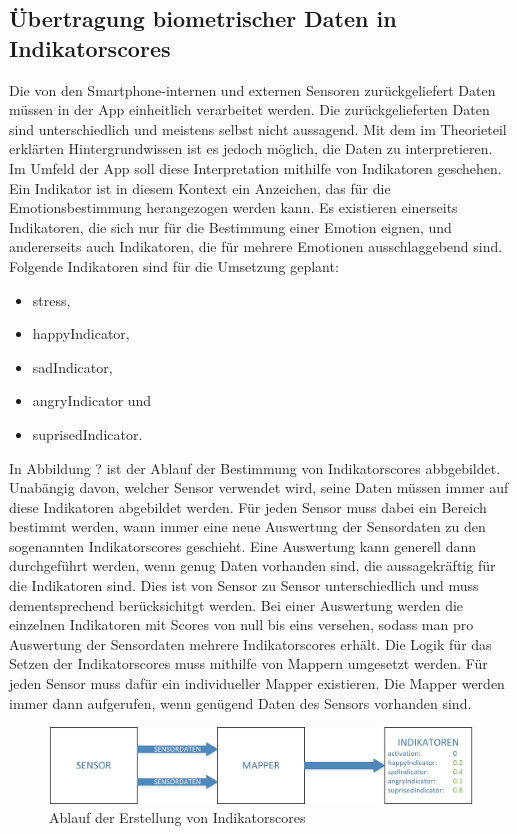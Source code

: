 \subsection{Übertragung biometrischer Daten in Indikatorscores}
Die von den Smartphone-internen und externen Sensoren zurückgeliefert Daten müssen in der App einheitlich verarbeitet werden. Die zurückgelieferten Daten sind unterschiedlich und meistens selbst nicht aussagend. Mit dem im Theorieteil erklärten Hintergrundwissen ist es jedoch möglich, die Daten zu interpretieren. \newline 
Im Umfeld der App soll diese Interpretation mithilfe von Indikatoren geschehen. Ein Indikator ist in diesem Kontext ein Anzeichen, das für die Emotionsbestimmung herangezogen werden kann. Es existieren einerseits Indikatoren, die sich nur für die Bestimmung einer Emotion eignen, und andererseits auch Indikatoren, die für mehrere Emotionen ausschlaggebend sind. Folgende Indikatoren sind für die Umsetzung geplant: 
\begin{itemize}[noitemsep, topsep=0pt]
	\item stress,
	\item happyIndicator,
	\item sadIndicator,
    \item angryIndicator und
    \item suprisedIndicator.
\end{itemize}
In Abbildung ? ist der Ablauf der Bestimmung von Indikatorscores abbgebildet. Unabängig davon, welcher Sensor verwendet wird, seine Daten müssen immer auf diese Indikatoren abgebildet werden. Für jeden Sensor muss dabei ein Bereich bestimmt werden, wann immer eine neue Auswertung der Sensordaten zu den sogenannten Indikatorscores geschieht. Eine Auswertung kann generell dann durchgeführt werden, wenn genug Daten vorhanden sind, die aussagekräftig für die Indikatoren sind. Dies ist von Sensor zu Sensor unterschiedlich und muss dementsprechend berücksichitgt werden. \newline
Bei einer Auswertung werden die einzelnen Indikatoren mit Scores von null bis eins versehen, sodass man pro Auswertung der Sensordaten mehrere Indikatorscores erhält. Die Logik für das Setzen der Indikatorscores muss mithilfe von Mappern umgesetzt werden. Für jeden Sensor muss dafür ein individueller Mapper existieren. Die Mapper werden immer dann aufgerufen, wenn genügend Daten des Sensors vorhanden sind. \newline
\begin{figure}[h]
	\centering
	\includegraphics[width=16cm]{Bilder/indicatorscore.png}
	\caption[Ablauf der Erstellung von Indikatorscores]{Ablauf der Erstellung von Indikatorscores}
\end{figure}%
